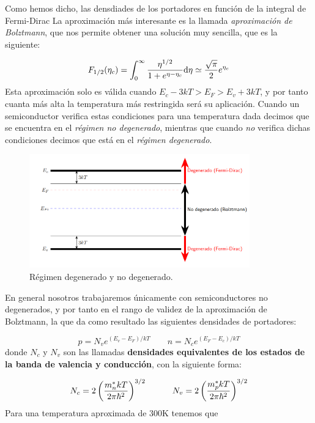 Como hemos dicho, las densdiades de los portadores en función de la integral de Fermi-Dirac
La aproximación más interesante es la llamada \textit{aproximación de Bolztmann}, que nos permite obtener una solución muy sencilla, que es la siguiente:

\begin{equation}
	F_{1/2} (\eta_c) = \int_{0}^{\infty} \frac{\eta^{1/2}}{1+ e^{\eta-\eta_c}} \mathrm{d} \eta \simeq \frac{\sqrt{\pi}}{2} e^{\eta_c} 
\end{equation}
Esta aproximación solo es válida cuando $E_c-3kT>E_F>E_v+3kT$, y por tanto cuanta más alta la temperatura más restringida será su aplicación. Cuando un semiconductor verifica estas condiciones para una temperatura dada decimos que se encuentra en el \textit{régimen no degenerado}, mientras que cuando \textit{no} verifica dichas condiciones decimos que está en el \textit{régimen degenerado}.

\begin{figure}[h!] \centering
	\includegraphics[width=0.85\textwidth]{Cuerpo/Ch_01/01_03.png}
	\caption{Régimen degenerado y no degenerado.}
\end{figure}


En general nosotros trabajaremos únicamente con semiconductores no degenerados, y por tanto en el rango de validez de la aproximación de Bolztmann, la que da como resultado las siguientes densidades de portadores:

\begin{equation}
	p=N_v e^{(E_v-E_F)/kT}  \qquad n = N_c e^{(E_F-E_c)/kT}
\end{equation}
donde $N_c$ y $N_v$ son las llamadas \textbf{densidades equivalentes de los estados de la banda de valencia y conducción}, con la siguiente forma:

\begin{equation}
	N_c = 2 \left( \frac{m_n^* kT}{2\pi\hbar^2} \right)^{3/2} \quad \quad \quad 
	N_v = 2 \left( \frac{m_p^* kT}{2\pi\hbar^2} \right)^{3/2}
\end{equation}
Para una temperatura aproximada de $300$K tenemos que 

